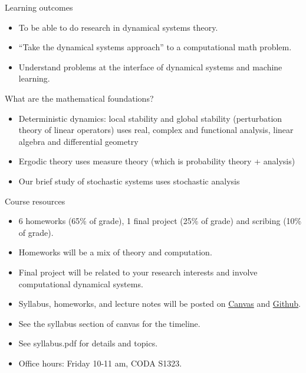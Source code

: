 \documentclass[final]{beamer}
\begin{document}
	\begin{frame}{Learning outcomes}
	\begin{itemize}
		\item To be able to do research in dynamical systems theory.
		\item ``Take the dynamical systems approach'' to a computational math problem.
		\pause
		\item Understand problems at the interface of dynamical systems and machine learning.
		\pause 
	\end{itemize}

\end{frame}
	\begin{frame}{What are the mathematical foundations?}
		\begin{itemize}
			\item Deterministic dynamics: local stability and global stability (perturbation theory of linear operators) uses real, complex and functional analysis, linear algebra and differential geometry
			\pause
		\item Ergodic theory uses measure theory (which is probability theory + analysis)
		\pause
	\item Our brief study of stochastic systems uses stochastic analysis
		\end{itemize}
	\end{frame}
	\begin{frame}{Course resources}
		\begin{itemize}
			\item 6 homeworks (65\% of grade), 1 final project (25\% of grade) and scribing (10\% of grade).
			\pause
			\item Homeworks will be a mix of theory and computation.
			\pause
			\item Final project will be related to your research interests and involve computational dynamical systems.
			\pause
		\item Syllabus, homeworks, and lecture notes will be posted on \href{https://canvas.gatech.edu}{Canvas} and \href{https://github.com/ni-sha-c/ComputationalDynamics-Spring24}{Github}.
			\pause
			\item See the syllabus section of canvas for the timeline.
			\pause
			\item See syllabus.pdf for details and topics.
			\pause
			\item Office hours: Friday 10-11 am, CODA S1323.
		\end{itemize}
	\end{frame}
\end{document}
